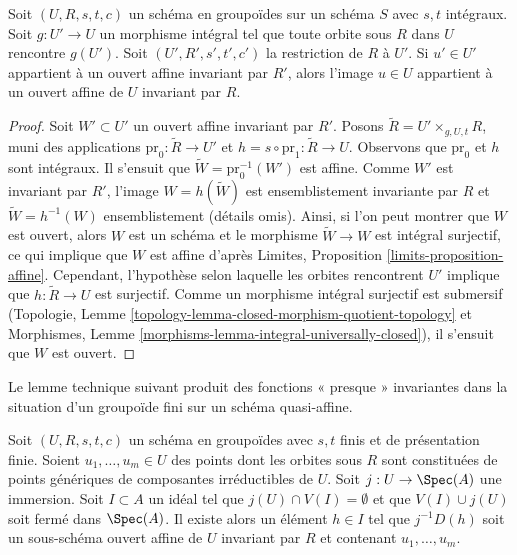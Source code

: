 \begin{lemma}
\label{lemma-find-affine-integral}
Soit $(U, R, s, t, c)$ un schéma en groupoïdes sur un schéma $S$
avec $s, t$ intégraux. Soit $g : U' \to U$ un morphisme intégral
tel que toute orbite sous $R$ dans $U$ rencontre $g(U')$. Soit $(U', R', s', t', c')$
la restriction de $R$ à $U'$. Si $u' \in U'$ appartient à un
ouvert affine invariant par $R'$, alors l'image $u \in U$ appartient
à un ouvert affine de $U$ invariant par $R$.
\end{lemma}

\begin{proof}
Soit $W' \subset U'$ un ouvert affine invariant par $R'$.
Posons $\tilde R = U' \times_{g, U, t} R$, muni des applications
$\text{pr}_0 : \tilde R \to U'$ et $h = s \circ \text{pr}_1 : \tilde R \to U$.
Observons que $\text{pr}_0$ et $h$ sont intégraux.
Il s'ensuit que $\tilde W = \text{pr}_0^{-1}(W')$ est affine.
Comme $W'$ est invariant par $R'$, l'image
$W = h(\tilde W)$ est ensemblistement invariante par $R$ et
$\tilde W = h^{-1}(W)$ ensemblistement (détails omis).
Ainsi, si l'on peut montrer que $W$ est ouvert, alors $W$ est un schéma
et le morphisme $\tilde W \to W$ est intégral surjectif,
ce qui implique que $W$ est affine d'après
Limites, Proposition \ref{limits-proposition-affine}.
Cependant, l'hypothèse selon laquelle les orbites rencontrent $U'$ implique
que $h : \tilde R \to U$ est surjectif. Comme un
morphisme intégral surjectif est submersif
(Topologie, Lemme \ref{topology-lemma-closed-morphism-quotient-topology}
et Morphismes, Lemme \ref{morphisms-lemma-integral-universally-closed}),
il s'ensuit que $W$ est ouvert.
\end{proof}

\noindent
Le lemme technique suivant produit des fonctions « presque » invariantes
dans la situation d'un groupoïde fini sur un
schéma quasi-affine.

\begin{lemma}
\label{lemma-find-almost-invariant-function}
Soit $(U, R, s, t, c)$ un schéma en groupoïdes avec $s, t$ finis et de
présentation finie. Soient $u_1, \ldots, u_m \in U$ des points dont les orbites sous $R$
sont constituées de points génériques de composantes irréductibles de $U$.
Soit $j : U \to \Spec(A)$ une immersion.
Soit $I \subset A$ un idéal tel que $j(U) \cap V(I) = \emptyset$
et que $V(I) \cup j(U)$ soit fermé dans $\Spec(A)$.
Il existe alors un élément $h \in I$ tel que $j^{-1}D(h)$
soit un sous-schéma ouvert affine de $U$ invariant par $R$ et contenant
$u_1, \ldots, u_m$.
\end{lemma}


